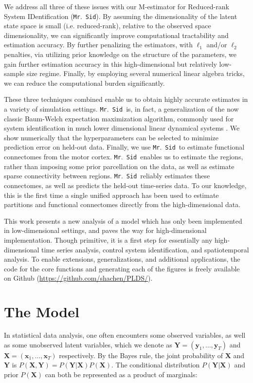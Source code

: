 \documentclass[times,twocolumn,final,authoryear]{elsarticle}
\newcommand{\mrsid}{{\sc \texttt{Mr}.~\texttt{Sid}}}
\providecommand{\mb}[1]{\boldsymbol{#1}}
\newcommand{\bx}{\mb{x}}
\newcommand{\by}{\mb{y}}
\newcommand{\bX}{\mb{X}}
\newcommand{\bY}{\mb{Y}}
\begin{document}
We address all three of these issues with our M-estimator for Reduced-rank  System IDentification (\mrsid).  By assuming the dimensionality of the latent state space is small (i.e. reduced-rank), relative to the observed space dimensionality, we can significantly improve computational tractability and estimation accuracy. By further penalizing the estimators, with $\ell_1$ and/or $\ell_2$ penalties, via utilizing prior knowledge on the structure of the parameters, we gain further estimation accuracy in this high-dimensional but relatively low-sample size regime.  Finally, by employing several numerical linear algebra tricks, we can reduce the computational burden significantly.

These three techniques combined enable us to obtain highly accurate estimates in a variety of simulation settings.  \mrsid~is, in fact, a generalization of the now classic Baum-Welch expectation maximization algorithm, commonly used for system identification in much lower dimensional linear dynamical systems \citep{rabiner1989tutorial}. We show numerically that the hyperparameters can be selected to minimize prediction error on held-out data.  Finally, we use \mrsid~to estimate functional connectomes from the motor cortex.  \mrsid~enables us to estimate the regions, rather than imposing some prior parcellation on the data, as well as estimate sparse connectivity between regions.  \mrsid~reliably estimates these connectomes, as well as predicts the held-out time-series data.  To our knowledge, this is the first time a single unified approach has been used to estimate partitions and functional connectomes directly from the high-dimensional data.

This work presents a new analysis of a model which has only been implemented in low-dimensional settings,
and paves the way for high-dimensional implementation. Though primitive, it is a first step for essentially any high-dimensional time series analysis, control system identification, and spatiotemporal analysis. To enable extensions, generalizations, and additional applications, the code for the core functions and generating each of the figures is freely available on Github (\url{https://github.com/shachen/PLDS/}).

\section{The Model}
In statistical data analysis, one often encounters some observed variables, as well as some unobserved latent variables, which we denote as $\bY=(\by_1,\ldots,\by_T)$ and $\bX=(\bx_1,\ldots,\bx_T)$ respectively. By the Bayes rule, the joint probability of $\bX$ and $\bY$ is $P(\bX,\bY)=P(\bY|\bX) P(\bX)$. The conditional distribution $P(\mb{Y}|\mb{X})$ and prior $P(\mb{X})$ can both be represented as a product of marginals:
\end{document}
